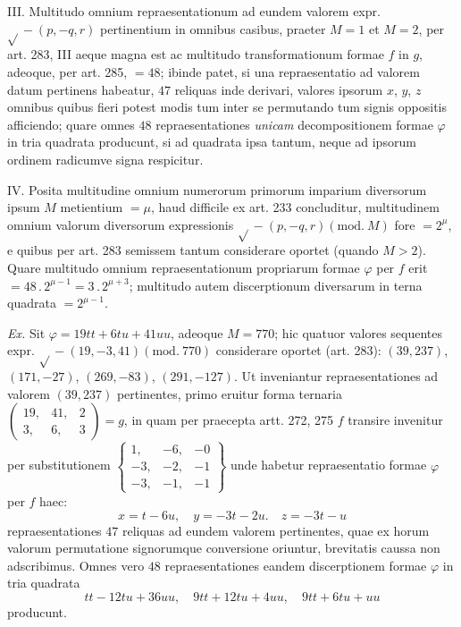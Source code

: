 III. Multitudo omnium repraesentationum ad eundem valorem expr. $\surd{}-(p,-q,r)$ pertinentium in omnibus casibus, praeter $M=1$ et $M=2$, per art. 283, III aeque magna est ac multitudo transformationum formae $f$ in $g$, adeoque, per art. 285, $=48$; ibinde patet, si una repraesentatio ad valorem datum pertinens habeatur, $47$ reliquas inde derivari, valores ipsorum $x$, $y$, $z$
omnibus quibus fieri potest modis tum inter se permutando tum signis oppositis afficiendo; quare omnes $48$ repraesentationes \textit{unicam} decompositionem formae $\varphi$ in tria quadrata producunt, si ad quadrata ipsa tantum, neque ad ipsorum ordinem radicumve signa respicitur.

IV. Posita multitudine omnium numerorum primorum imparium diversorum ipsum $M$ metientium $=\mu$, haud difficile ex art. 233 concluditur, multitudinem omnium valorum diversorum expressionis $\surd{}-(p,\allowbreak -q,\allowbreak r)(\mathrm{mod.}\ M)$ fore $=2^\mu$, e quibus per art. 283 semissem tantum considerare oportet (quando $M>2$). Quare multitudo omnium repraesentationum propriarum formae $\varphi$ per $f$ erit $=48\,\allowbreak  .\,\allowbreak  2^{\mu-1}=3\,\allowbreak  .\,\allowbreak  2^{\mu+3}$; multitudo autem discerptionum diversarum in terna quadrata $=2^{\mu-1}$.

\textit{Ex.} Sit $\varphi=19tt+6tu+41uu$, adeoque $M=770$; hic quatuor valores sequentes expr. $\surd{}-(19,\allowbreak -3,\allowbreak 41)(\mathrm{mod.}\ 770)$ considerare oportet (art. 283): $(39,237)$, $(171,-27)$, $(269,-83)$, $(291,-127)$. Ut inveniantur repraesentationes ad valorem $(39,237)$ pertinentes, primo eruitur forma ternaria $\left(\begin{smallmatrix}19,&41,&2\\3,&6,&3\end{smallmatrix}\right)=g$, in quam per praecepta artt. 272, 275 $f$ transire invenitur per substitutionem $\left\{\begin{smallmatrix}1,&-6,&-0\\-3,&-2,&-1\\-3,&-1,&-1\end{smallmatrix}\right\}$ unde habetur repraesentatio formae $\varphi$ per $f$ haec:
\[
x=t-6u,\quad y=-3t-2u.\quad z=-3t-u
\]
repraesentationes $47$ reliquas ad eundem valorem pertinentes, quae ex horum valorum permutatione signorumque conversione oriuntur, brevitatis caussa non adscribimus. Omnes vero $48$ repraesentationes eandem discerptionem formae $\varphi$ in tria quadrata
\[
tt-12tu+36uu,\quad 9tt+12tu+4uu,\quad 9tt+6tu+uu
\]
producunt.

